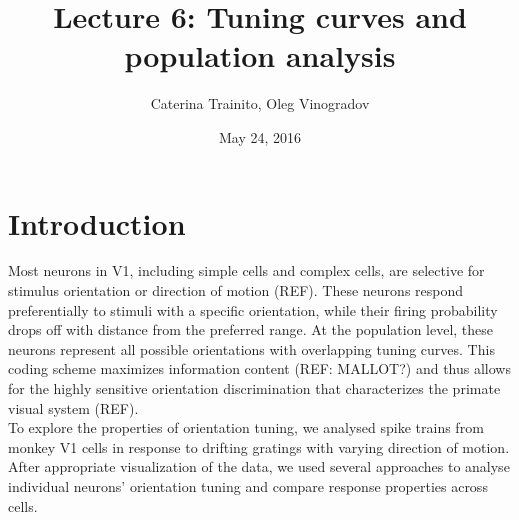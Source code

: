 \documentclass[10pt]{article}
\title{Lecture 6: Tuning curves and population analysis}
\author{Caterina Trainito, Oleg Vinogradov}
\date{May 24, 2016}
\begin{document}
\maketitle

\section*{Introduction}

Most neurons in V1, including simple cells and complex cells, are selective for stimulus orientation or direction of motion (REF). These neurons respond preferentially to stimuli with a specific orientation, while their firing probability drops off with distance from the preferred range. At the population level, these neurons represent all possible orientations with overlapping tuning curves. This coding scheme maximizes information content (REF: MALLOT?) and thus allows for the highly sensitive orientation discrimination that characterizes the primate visual system (REF). \\

To explore the properties of orientation tuning, we analysed spike trains from monkey V1 cells in response to drifting gratings with varying direction of motion. After appropriate visualization of the data, we used several approaches to analyse individual neurons' orientation tuning and compare response properties across cells.
\end{document}
